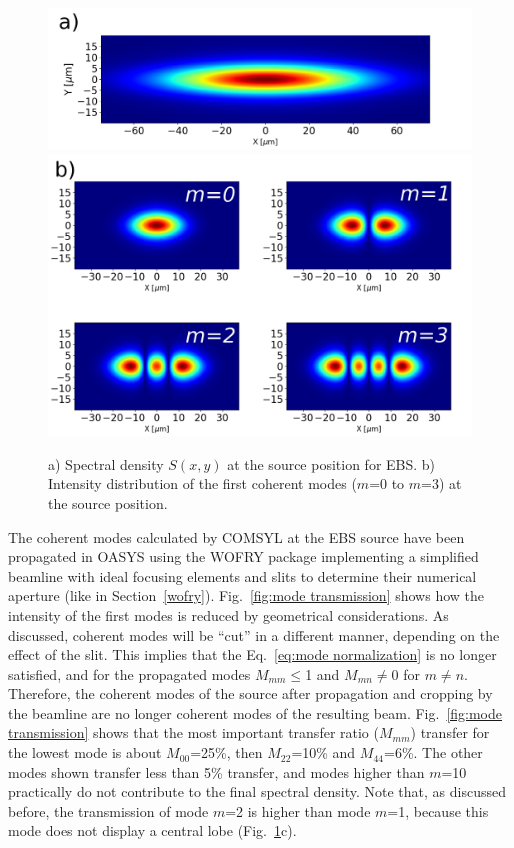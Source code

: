 \documentclass{iucr}              %
\begin{document}
\begin{figure}\label{fig:spectraldensity}
    \centering
        \includegraphics[width=\textwidth]{GRAPHICS/ebs_spectral_density.png}
        \includegraphics[width=\textwidth]{GRAPHICS/figure9b.png}
    \caption{a) Spectral density $S(x,y)$ at the source position for EBS. b) Intensity distribution of the first coherent modes ($m$=0 to $m$=3) at the source position.
    }
\end{figure}


The coherent modes calculated by COMSYL at the EBS source have been propagated in OASYS using the WOFRY package implementing a simplified beamline with ideal focusing elements and slits to determine their numerical aperture (like in Section~\ref{wofry}). Fig.~\ref{fig:mode transmission} shows how the intensity of the first modes is reduced by geometrical considerations. 
As discussed, coherent modes will be ``cut'' in a different manner, depending on the effect of the slit.
This implies that the Eq.~\ref{eq:mode normalization} is no longer satisfied, and for the propagated modes $M_{mm}\le$1 and $M_{mn}\ne$0 for $m\ne n$. Therefore, the coherent modes of the source after propagation and cropping by the beamline are no longer coherent modes of the resulting beam. Fig.~\ref{fig:mode transmission} shows that the most important transfer ratio ($M_{mm}$) transfer for the lowest mode is about $M_{00}$=25\%, then $M_{22}$=10\% and $M_{44}$=6\%. The other modes shown transfer less than 5\% transfer, and modes higher than $m$=10 practically do not contribute to the final spectral density. Note that, as discussed before, the transmission of mode $m$=2 is higher than mode $m$=1, because this mode does not display a central lobe (Fig.~\ref{fig:spectraldensity}c).  
\end{document}

